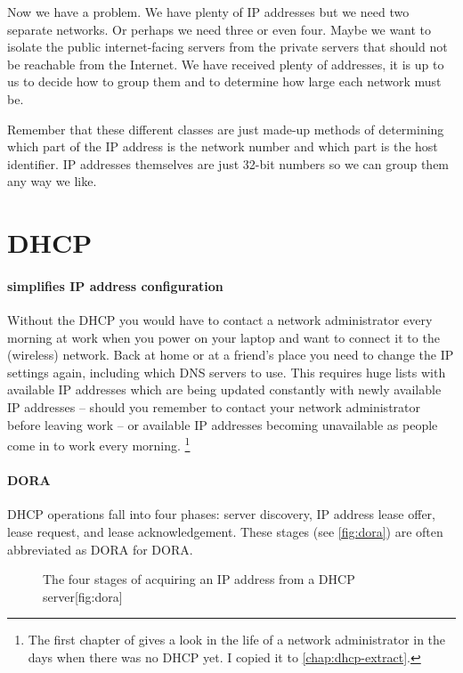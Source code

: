 Now we have a problem.
We have plenty of \acs{IP} addresses but we need two separate networks.
Or perhaps we need three or even four.
Maybe we want to isolate the public internet-facing servers from the private servers that should not be reachable from the Internet.
We have received plenty of addresses, it is up to us to decide how to group them and to determine how large each network must be.

Remember that these different classes are just made-up methods of determining which part of the \acs{IP} address is the network number and which part is the host identifier.
\acs{IP} addresses themselves are just 32-bit numbers so we can group them any way we like.


\section{\acl{DHCP}}
\label{sec:ip-dhcp}


\paragraph{simplifies \acs{IP} address configuration}
Without the \gls{DHCP} you would have to contact a network administrator every morning at work when you power on your laptop and want to connect it to the (wireless) network.
Back at home or at a friend's place you need to change the \acs{IP} settings again, including which \acs{DNS} servers to use.
This requires huge lists with available \acs{IP} addresses which are being updated constantly with newly available \acs{IP} addresses -- should you remember to contact your network administrator before leaving work -- or available \acs{IP} addresses becoming unavailable as people come in to work every morning.%
   \footnote{%
      The first chapter of \textcite[3-7]{droms} gives a look in the life of a network administrator in the days when there was no \acs{DHCP} yet.
      I copied it to \vref{chap:dhcp-extract}.
   }

\paragraph{\acs{DORA}}
\gls{DHCP} operations fall into four phases: server discovery, \acs{IP} address lease offer, lease request, and lease acknowledgement.
These stages (see \vref{fig:dora}) are often abbreviated as \acs{DORA} for \acl{DORA}.

\begin{figure}
\begin{sidecaption}{The four stages of acquiring an \acs{IP} address from a \acs{DHCP} server}[fig:dora]
\centering

\end{sidecaption}
\end{figure}

